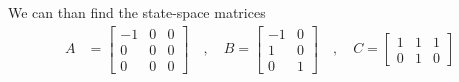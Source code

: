 \documentclass[twoside]{article}
\begin{document}
%
We can than find the state-space matrices 
%
\begin{align*}
A &= \left[ \begin{array}{c|cc} -1 & 0 & 0 \\ \hline 0 & 0 & 0 \\ 0 & 0 & 0   \end{array} \right]
\quad , \quad 
B = \left[ \begin{array}{cc} -1 & 0 \\  \hline 1 & 0 \\ 0 & 1 \end{array} \right]
\quad , \quad 
	C = \left[ \begin{array}{c|cc} 1  & 1 & 1 \\ 0 & 1 & 0  \end{array} \right]
\end{align*}
% 
\end{document}
